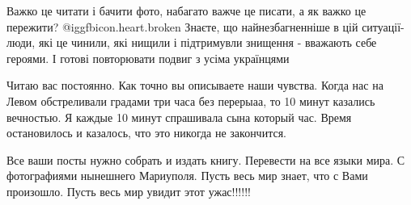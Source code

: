 \begin{itemize}
\begin{itemize}
\end{itemize} %


Важко це читати і бачити фото, набагато важче це писати, а як важко це
пережити?  @igg{fbicon.heart.broken}  Знаєте, що найнезбагненніше в цій ситуації- люди, які це чинили,
які нищили і підтримувли знищення - вважають себе героями. І готові повторювати
подвиг з усіма українцями


Читаю вас постоянно. Как точно вы описываете наши чувства. Когда нас на Левом
обстреливали градами три часа без перерыаа, то 10 минут казались вечностью. Я
каждые 10 минут спрашивала сына который час. Время остановилось и казалось, что
это никогда не закончится.


Все ваши посты нужно собрать и издать книгу. Перевести на все языки мира. С
фотографиями нынешнего Мариуполя. Пусть весь мир знает, что с Вами произошло.
Пусть весь мир увидит этот ужас!!!!!!

\end{itemize} %
